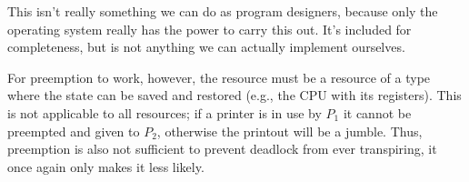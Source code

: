 This isn't really something we can do as program designers, because only the operating system really has the power to carry this out. It's included for completeness, but is not anything we can actually implement ourselves.

For preemption to work, however, the resource must be a resource of a type where the state can be saved and restored (e.g., the CPU with its registers). This is not applicable to all resources; if a printer is in use by $P_{1}$ it cannot be preempted and given to $P_{2}$, otherwise the printout will be a jumble. Thus, preemption is also not sufficient to prevent deadlock from ever transpiring, it once again only makes it less likely.




